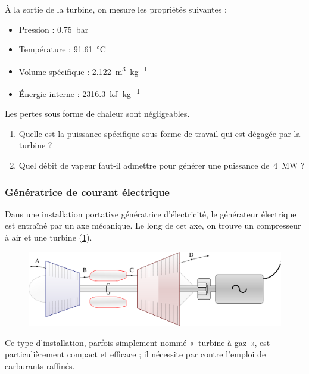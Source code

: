 	À la sortie de la turbine, on mesure les propriétés suivantes :
		
	\begin{itemize}
		\item Pression : 			\tab \SI{0,75}{\bar}
		\item Température : 		\tab \SI{91,61}{\degreeCelsius}
		\item Volume spécifique : 	\tab \SI{2,122}{\metre\cubed\per\kilogram}
		\item Énergie interne : 	\tab \SI{2316,3}{\kilo\joule\per\kilogram}
	\end{itemize}
	
	Les pertes sous forme de chaleur sont négligeables.
	
	\begin{enumerate}
		\item Quelle est la puissance spécifique sous forme de travail qui est dégagée par la turbine ?
		\item Quel débit de vapeur faut-il admettre pour générer une puissance de~\SI{4}{\mega\watt} ?
	\end{enumerate}



\subsubsection{Génératrice de courant électrique}
\label{exo_generatrice_electrique}

	Dans une installation portative génératrice d’électricité, le générateur électrique est entraîné par un axe mécanique. Le long de cet axe, on trouve un compresseur à air et une turbine (\cref{fig_elgen}).
	\begin{figure}
		\begin{center}
			\includegraphics[width=\textwidth]{images/circuit_generateur.png}
		\end{center}
		\label{fig_elgen}
	\end{figure}	
	Ce type d’installation, parfois simplement nommé «~turbine à gaz~», est particulièrement compact et efficace ; il nécessite par contre l’emploi de carburants raffinés.

